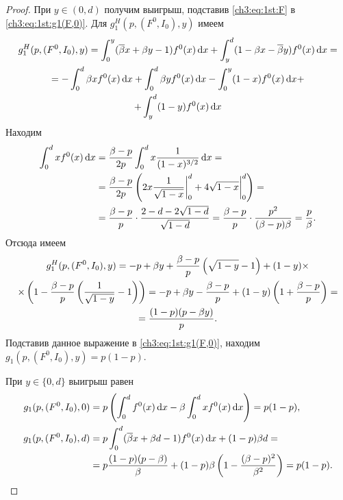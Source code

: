 {\begin{lemma}
\end{lemma}
\begin{proof}
  При $y \in (0, d)$ получим выигрыш, подставив \eqref{ch3:eq:1st:F} в \eqref{ch3:eq:1st:g1(F,0)}.
  Для $g^H_1(p, (F^0, I_0), y)$ имеем
  \begin{equation*}
    \begin{gathered}
    g^H_1(p, (F^0, I_0), y) 
    =
    \int_0^y ({{\overline{\beta}}} x + \beta y - 1) f^0(x) \mathop{}\!\mathrm{d} x +
    \int_y^d (1 - \beta x - {{\overline{\beta}}} y) f^0(x) \mathop{}\!\mathrm{d} x = \\
    =
    - \int_0^d \beta x f^0(x) \mathop{}\!\mathrm{d} x +
    \int_0^d \beta y f^0(x) \mathop{}\!\mathrm{d} x -
    \int_0^y (1-x) f^0(x) \mathop{}\!\mathrm{d} x + \\
    + \int_y^d (1-y) f^0(x) \mathop{}\!\mathrm{d} x
    \end{gathered}
  \end{equation*}
  Находим
  \begin{equation}
    \label{ch3:eq:1st:f-exp}
    \begin{aligned}
      \int_0^d x f^0(x) \mathop{}\!\mathrm{d} x 
      &= \frac{\beta - p}{2 p} \int_0^d x \frac{1}{(1-x)^{3/2}} \mathop{}\!\mathrm{d} x = \\
      &= \frac{\beta - p}{2 p} \left( 
        2x \frac{1}{\sqrt{1-x}} \bigg|_0^d +
        4 \sqrt{1-x} \bigg|_0^d
      \right) = \\
      &= \frac{\beta - p}{p} \cdot \frac{2 - d - 2\sqrt{1-d}}{\sqrt{1-d}} =
      \frac{\beta - p}{p} \cdot \frac{p^2}{(\beta - p) \beta} = \frac{p}{\beta}.
    \end{aligned}
  \end{equation}
  Отсюда имеем
  \begin{gather*}
    g^H_1(p, (F^0, I_0), y) 
    = -p + \beta y +
    \frac{\beta - p}{p} \left( \sqrt{1-y} - 1 \right) +
    (1-y) \times \\
    \times \left( 1 - \frac{\beta - p}{p} \left( \frac{1}{\sqrt{1-y}} - 1 \right) \right) =
    -p + \beta y - \frac{\beta - p}{p} + (1-y) \left( 1 + \frac{\beta - p}{p} \right) = \\
    = \frac{(1-p)(p - \beta y)}{p}.
  \end{gather*}
  Подставив данное выражение в \eqref{ch3:eq:1st:g1(F,0)}, находим $g_1(p, (F^0, I_0), y) = p (1-p)$.

  При $y \in \{0, d\}$ выигрыш равен
  \begin{align*}
    g_1(p, (F^0, I_0), 0) 
    &= p \left(\int_0^d f^0(x) \mathop{}\!\mathrm{d} x - \beta \int_0^d x f^0(x) \mathop{}\!\mathrm{d} x \right) =
      p(1-p),\\
    g_1(p, (F^0, I_0), d) 
    &=
      p \int_0^d ({{\overline{\beta}}} x + \beta d - 1) f^0(x) \mathop{}\!\mathrm{d} x + (1-p) \beta d = \\
    &= p \frac{(1-p)(p-\beta)}{\beta} +
      (1-p) \beta \left( 1 - \frac{(\beta - p)^2}{\beta^2} \right) = p(1-p).
  \end{align*}


\end{proof}}
